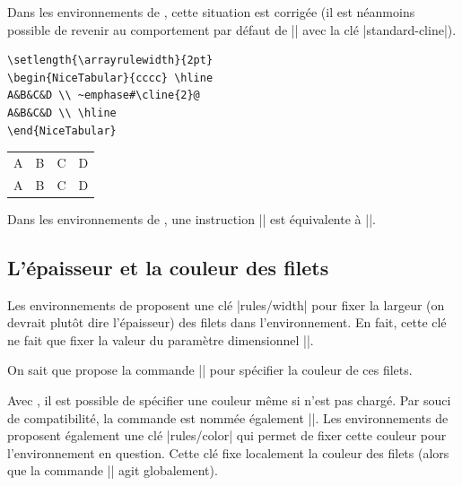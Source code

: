 \documentclass[dvipsnames]{article}%
\begin{document}
\medskip
Dans les environnements de , cette situation est corrigée (il
est néanmoins possible de revenir au comportement par défaut de |\cline| avec la
clé |standard-cline|).

\medskip
\begin{BVerbatim}[baseline=c,boxwidth=10cm]
\setlength{\arrayrulewidth}{2pt}
\begin{NiceTabular}{cccc} \hline
A&B&C&D \\ ~emphase#\cline{2}@
A&B&C&D \\ \hline
\end{NiceTabular}
\end{BVerbatim}
%
\begin{scope}
\setlength{\arrayrulewidth}{2pt}
\begin{NiceTabular}[c]{cccc}
\hline
A&B&C&D \\
A&B&C&D \\
\hline
\end{NiceTabular}
\end{scope}

\medskip
Dans les environnements de , une instruction
|| est équivalente à
||.

\subsection{L'épaisseur et la couleur des filets}

Les environnements de  proposent une clé |rules/width| pour
fixer la largeur (on devrait plutôt dire l'épaisseur) des filets dans
l'environnement. En fait,  cette clé ne fait que fixer la valeur du paramètre
dimensionnel |\arrayrulewidth|.

\smallskip
On sait que  propose la commande |\arrayrulecolor| pour spécifier
la couleur de ces filets.

\smallskip
Avec , il est possible de spécifier une couleur même si
 n'est pas chargé. Par souci de compatibilité, la commande est
nommée également |\arrayrulecolor|. Les environnements de 
proposent également une clé |rules/color| qui permet de fixer cette couleur pour
l'environnement en question. Cette clé fixe localement la couleur des filets
(alors que la commande |\arrayrulecolor| agit globalement).
\end{document}

